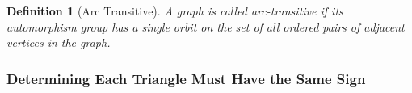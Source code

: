 \documentclass[12pt]{article}
\theoremstyle{parenbold}
\newtheorem{definition}{Definition}[section]
\begin{document}
\begin{definition}[Arc Transitive]
A graph is called arc-transitive if its automorphism group has a single orbit on the set of all ordered pairs of adjacent vertices in the graph. \cite{conder2015orders}
\end{definition}

\subsubsection{Determining Each Triangle Must Have the Same Sign}






\end{document}
